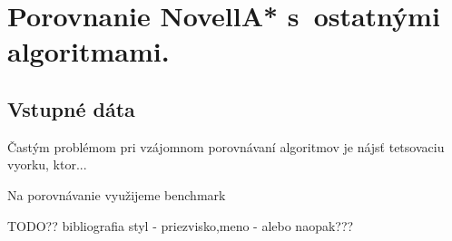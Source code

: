 \chapter{Porovnanie NovellA* s~ostatnými algoritmami.}

\section{Vstupné dáta}
Častým problémom pri vzájomnom porovnávaní algoritmov je
nájsť tetsovaciu vyorku, ktor... \cite{sturtevant2012benchmarks}


Na porovnávanie využijeme benchmark

TODO?? bibliografia styl - priezvisko,meno - alebo naopak???